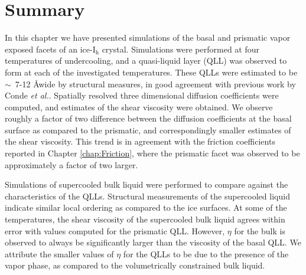 

\section{Summary}
In this chapter we have presented simulations of the basal and
prismatic vapor exposed facets of an ice-I$_\mathrm{h}$
crystal. Simulations were performed at four temperatures of
undercooling, and a quasi-liquid layer (QLL) was observed to form at
each of the investigated temperatures. These QLLs were estimated to be
$\sim $~7-12 \AA wide by structural measures, in good agreement with
previous work by Conde \textit{et al.}.\cite{Conde2008} Spatially
resolved three dimensional diffusion coefficients were computed, and
estimates of the shear viscosity were obtained. We observe roughly a
factor of two difference between the diffusion coefficients at the
basal surface as compared to the prismatic, and correspondingly
smaller estimates of the shear viscosity. This trend is in agreement
with the friction coefficients reported in Chapter
\ref{chap:Friction}, where the prismatic facet was observed to be
approximately a factor of two larger.

Simulations of supercooled bulk liquid were performed to compare
against the characteristics of the QLLs. Structural measurements of
the supercooled liquid indicate similar local ordering as compared to
the ice surfaces. At some of the temperatures, the shear viscosity of
the supercooled bulk liquid agrees within error with values computed
for the prismatic QLL. However, $\eta$ for the bulk is observed to
always be significantly larger than the viscosity of the basal QLL. We
attribute the smaller values of $\eta$ for the QLLs to be due to the
presence of the vapor phase, as compared to the volumetrically
constrained bulk liquid. 
